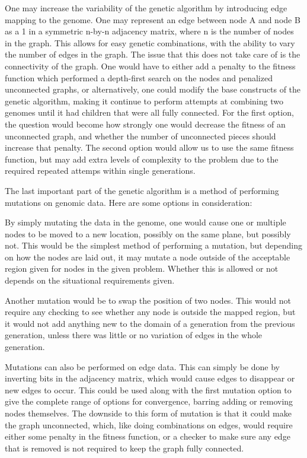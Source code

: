 \documentclass[letter,10pt]{article}
\begin{document}
One may increase the variability of the genetic algorithm by introducing edge mapping to the genome.  One may represent an edge between node A and node B as a 1 in a symmetric n-by-n adjacency matrix, where n is the number of nodes in the graph.  This allows for easy genetic combinations, with the ability to vary the number of edges in the graph.  The issue that this does not take care of is the connectivity of the graph.  One would have to either add a penalty to the fitness function which performed a depth-first search on the nodes and penalized unconnected graphs, or alternatively, one could modify the base constructs of the genetic algorithm, making it continue to perform attempts at combining two genomes until it had children that were all fully connected.  For the first option, the question would become how strongly one would decrease the fitness of an unconnected graph, and whether the number of unconnected pieces should increase that penalty.  The second option would allow us to use the same fitness function, but may add extra levels of complexity to the problem due to the required repeated attemps within single generations.

The last important part of the genetic algorithm is a method of performing mutations on genomic data.  Here are some options in consideration:

By simply mutating the data in the genome, one would cause one or multiple nodes to be moved to a new location, possibly on the same plane, but possibly not.  This would be the simplest method of performing a mutation, but depending on how the nodes are laid out, it may mutate a node outside of the acceptable region given for nodes in the given problem.  Whether this is allowed or not depends on the situational requirements given.

Another mutation would be to swap the position of two nodes.  This would not require any checking to see whether any node is outside the mapped region, but it would not add anything new to the domain of a generation from the previous generation, unless there was little or no variation of edges in the whole generation.

Mutations can also be performed on edge data.  This can simply be done by inverting bits in the adjacency matrix, which would cause edges to disappear or new edges to occur.  This could be used along with the first mutation option to give the complete range of options for convergence, barring adding or removing nodes themselves.  The downside to this form of mutation is that it could make the graph unconnected, which, like doing combinations on edges, would require either some penalty in the fitness function, or a checker to make sure any edge that is removed is not required to keep the graph fully connected.
\end{document}
